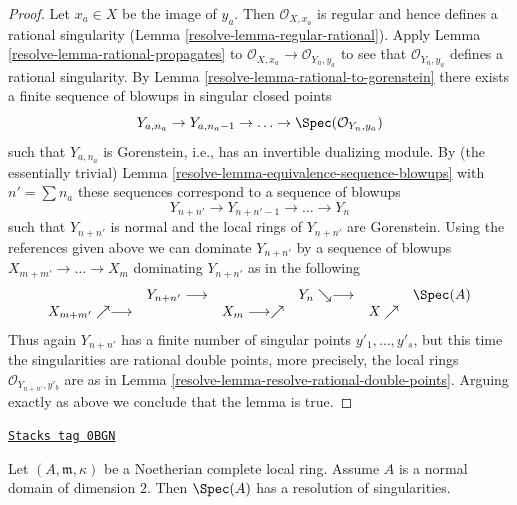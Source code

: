 \begin{proof}
\medskip\noindent
Let $x_a \in X$ be the image of $y_a$. Then $\mathcal{O}_{X, x_a}$
is regular and hence defines a rational singularity
(Lemma \ref{resolve-lemma-regular-rational}).
Apply Lemma \ref{resolve-lemma-rational-propagates} to
$\mathcal{O}_{X, x_a} \to \mathcal{O}_{Y_n, y_a}$
to see that $\mathcal{O}_{Y_n, y_a}$ defines a
rational singularity. By Lemma \ref{resolve-lemma-rational-to-gorenstein}
there exists a finite sequence of blowups in singular closed points
$$
Y_{a, n_a} \to Y_{a, n_a - 1} \to \ldots \to \Spec(\mathcal{O}_{Y_n, y_a})
$$
such that $Y_{a, n_a}$ is Gorenstein, i.e., has an
invertible dualizing module. By (the essentially trivial)
Lemma \ref{resolve-lemma-equivalence-sequence-blowups}
with $n' = \sum n_a$ these sequences correspond to a sequence of
blowups
$$
Y_{n + n'} \to Y_{n + n' - 1} \to \ldots \to Y_n
$$
such that $Y_{n + n'}$ is normal and
the local rings of $Y_{n + n'}$ are Gorenstein. Using the references
given above we can dominate $Y_{n + n'}$ by a sequence of blowups
$X_{m + m'} \to \ldots \to X_m$ dominating $Y_{n + n'}$ as in the following
$$
\begin{array}{cccccc} & Y_{n + n'} \longrightarrow &  & Y_n \searrow\longrightarrow &  & \Spec(A) \\ X_{m + m'} \nearrow\longrightarrow &  & X_m \longrightarrow\nearrow &  & X \nearrow & \end{array}
$$
Thus again $Y_{n + n'}$ has a finite number of singular points
$y'_1, \ldots, y'_s$, but this time the singularities are
rational double points, more precisely, the local rings
$\mathcal{O}_{Y_{n + n'}, y'_b}$ are as in
Lemma \ref{resolve-lemma-resolve-rational-double-points}.
Arguing exactly as above we conclude that the lemma is true.
\end{proof}

\begin{lemma}
\label{resolve-lemma-resolve-complete}
\href{https://stacks.math.columbia.edu/tag/0BGN}{\texttt{Stacks tag 0BGN}}

Let $(A, \mathfrak m, \kappa)$ be a Noetherian complete local ring.
Assume $A$ is a normal domain of dimension $2$. Then $\Spec(A)$ has a
resolution of singularities.
\end{lemma}


